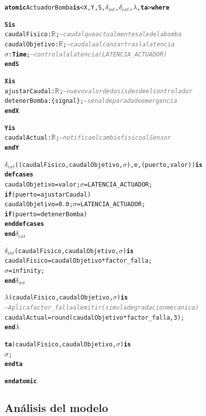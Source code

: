\documentclass[12pt, a4paper]{article}
\newcommand{\kw}[1]{\textbf{#1}}
\newcommand{\cmlR}{$\mathbb{R}$}
\newcommand{\cmlTime}{\textbf{Time}}
\newcommand{\cmlsigma}{$\sigma$}
\newcommand{\dint}{$\delta_{\mathit{int}}$}
\newcommand{\dext}{$\delta_{\mathit{ext}}$}
\newcommand{\clambda}{$\lambda$}
\newcommand{\cmlta}{\textbf{ta}}
\newcommand{\cmlcomment}[1]{\textit{\textcolor{gray}{#1}}}
\newenvironment{cmldevs}{%
  \begin{alltt}\small%
}{%
  \end{alltt}%
}
\begin{document}
\begin{center}
\begin{cmldevs}
\kw{atomic} ActuadorBomba \kw{is} <X, Y, S, \dint{}, \dext{}, \clambda{}, \cmlta{}> \kw{where}

\kw{S is}
    caudalFisico   : \cmlR{};       \cmlcomment{-- caudal que actualmente sale de la bomba}
    caudalObjetivo : \cmlR{};       \cmlcomment{-- caudal a alcanzar tras la latencia}
    \cmlsigma{}            : \cmlTime{};    \cmlcomment{-- controla la latencia (LATENCIA\_ACTUADOR)}
\kw{end S}

\kw{X is}
    ajustarCaudal : \cmlR{};        \cmlcomment{-- nuevo valor de dosis desde el controlador}
    detenerBomba  : \{signal\};     \cmlcomment{-- senal de parada de emergencia}
\kw{end X}

\kw{Y is}
    caudalActual : \cmlR{};         \cmlcomment{-- notifica el cambio fisico al Sensor}
\kw{end Y}

\dext{}((caudalFisico, caudalObjetivo, \cmlsigma{}), e, (puerto, valor)) \kw{is}
    \kw{defcases}
        caudalObjetivo = valor;   \cmlsigma{} = LATENCIA\_ACTUADOR;
            \kw{if} (puerto = ajustarCaudal)
        caudalObjetivo = 0.0;     \cmlsigma{} = LATENCIA\_ACTUADOR;
            \kw{if} (puerto = detenerBomba)
    \kw{end defcases}
\kw{end} \dext{}

\dint{}(caudalFisico, caudalObjetivo, \cmlsigma{}) \kw{is}
    caudalFisico = caudalObjetivo * factor\_falla;
    \cmlsigma{}          = infinity;
\kw{end} \dint{}

\clambda{}(caudalFisico, caudalObjetivo, \cmlsigma{}) \kw{is}
    \cmlcomment{-- Aplica factor\_falla al emitir (simula degradacion mecanica)}
    caudalActual = round(caudalObjetivo * factor\_falla, 3);
\kw{end} \clambda{}

\cmlta{}(caudalFisico, caudalObjetivo, \cmlsigma{}) \kw{is}
    \cmlsigma{};
\kw{end} \cmlta{}

\kw{end atomic}
\end{cmldevs}
\label{fig:actuador-bomba}
\end{center}

\subsection*{Análisis del modelo}
\end{document}
